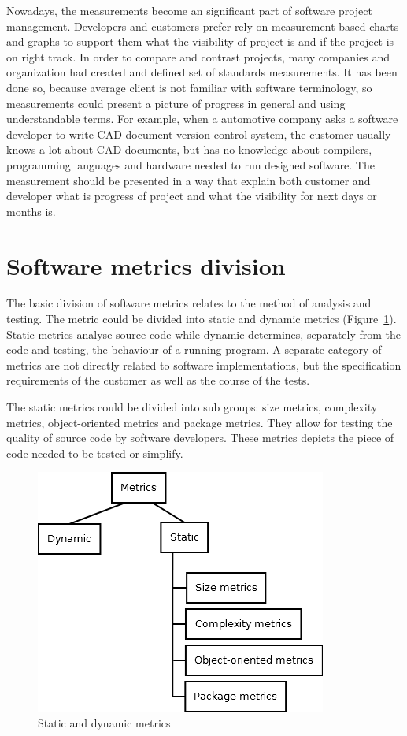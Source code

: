 Nowadays, the measurements become an significant part of software project management. Developers and customers prefer rely on measurement-based charts and graphs to support them what the visibility of project is and if the project is on right track. In order to compare and contrast projects, many companies and organization had created and defined set of standards measurements. It has been done so, because average client is not familiar with software terminology, so measurements could present a picture of progress in general and using understandable terms. For example, when a automotive company asks a software developer to write \ac{CAD} document version control system, the customer usually knows a lot about \ac{CAD} documents, but has no knowledge about compilers, programming languages and hardware needed to run designed software. The measurement should be presented in a way that explain both customer and developer what is progress of project and what the visibility for next days or months is.  

\section{Software metrics division}
The basic division of software metrics relates to the method of analysis and testing.  The metric could be divided into static and dynamic metrics (Figure~\ref{fig:metrics1}). Static metrics analyse source code while dynamic determines, separately from the code and testing, the behaviour of a running program. A separate category of metrics are not directly related to software implementations, but the specification requirements of the customer as well as the course of the tests.

The static metrics could be divided into sub groups: size metrics, complexity metrics, object-oriented metrics and package metrics. They allow for testing the quality of source code by software developers. These metrics depicts the piece of code needed to be tested or simplify.  

\begin{figure}[h!]
	\centering
	\includegraphics[scale=0.7]{img/Diagram1.png} 
	\caption{Static and dynamic metrics}		
	\label{fig:metrics1}
\end{figure}

